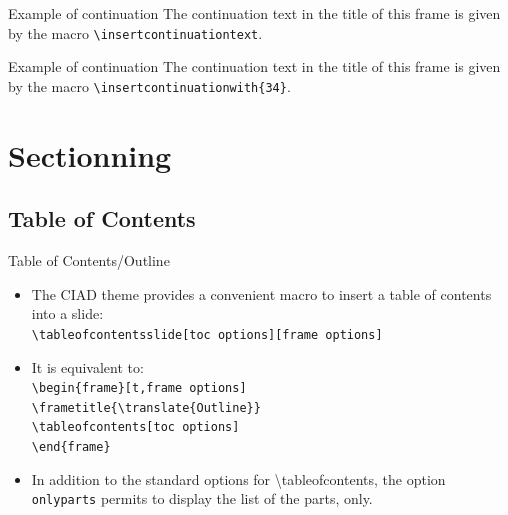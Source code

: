 \documentclass[english,sectioncirclenumberstyle]{ciadbeamer}
\begin{document}
\begin{frame}{Example of continuation \insertcontinuationtext}
	The continuation text in the title of this frame is given by the macro \texttt{{\textbackslash}insertcontinuationtext}.
\end{frame}

\begin{frame}{Example of continuation}
	The continuation text in the title of this frame is given by the macro \texttt{{\textbackslash}insertcontinuationwith\{34\}}.
\end{frame}

\section{Sectionning}
\tableofcontentslide[sectionstyle={show/shaded},subsectionstyle={show/show/hide},subsubsectionstyle={hide/hide/hide/hide},sections={1-6}]

\subsection{Table of Contents}

\begin{frame}{Table of Contents/Outline}
	\begin{itemize}
	\item The CIAD theme provides a convenient macro to insert a table of contents into a slide: \\
		\texttt{{\textbackslash}tableofcontentsslide[toc options][frame options]}
	\vspace{1em}
	\item It is equivalent to: \\
		\texttt{{\textbackslash}begin\{frame\}[t,frame options]} \\
		\texttt{{\textbackslash}frametitle\{{\textbackslash}translate\{Outline\}\}} \\
		\texttt{{\textbackslash}tableofcontents[toc options]} \\
		\texttt{{\textbackslash}end\{frame\}}
	\vspace{1em}
	\item In addition to the standard options for {{\textbackslash}tableofcontents}, the option \texttt{onlyparts} permits to display the list of the parts, only.
	\end{itemize}
\end{frame}
\end{document}
